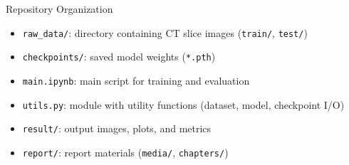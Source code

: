 

\begin{frame}{Repository Organization}
  \begin{itemize}
    \item \texttt{raw\_data/}: directory containing CT slice images (\texttt{train/}, \texttt{test/})
    \item \texttt{checkpoints/}: saved model weights (\texttt{*.pth})
    \item \texttt{main.ipynb}: main script for training and evaluation
    \item \texttt{utils.py}: module with utility functions (dataset, model, checkpoint I/O)
    \item \texttt{result/}: output images, plots, and metrics
    \item \texttt{report/}: report materials (\texttt{media/}, \texttt{chapters/})
  \end{itemize}
\end{frame}
